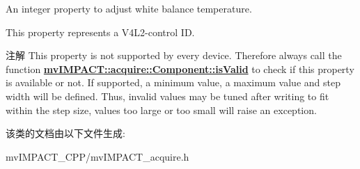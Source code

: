 An integer property to adjust white balance temperature. 

This property represents a V4\+L2-\/control I\+D.

\begin{DoxyNote}{注解}
This property is not supported by every device. Therefore always call the function {\bfseries \hyperlink{classmv_i_m_p_a_c_t_1_1acquire_1_1_component_ac51e55e7e046101f3c6119d84123abd5}{mv\+I\+M\+P\+A\+C\+T\+::acquire\+::\+Component\+::is\+Valid}} to check if this property is available or not. If supported, a minimum value, a maximum value and step width will be defined. Thus, invalid values may be tuned after writing to fit within the step size, values too large or too small will raise an exception. 
\end{DoxyNote}


该类的文档由以下文件生成\+:\begin{DoxyCompactItemize}
\item 
mv\+I\+M\+P\+A\+C\+T\+\_\+\+C\+P\+P/mv\+I\+M\+P\+A\+C\+T\+\_\+acquire.\+h\end{DoxyCompactItemize}
